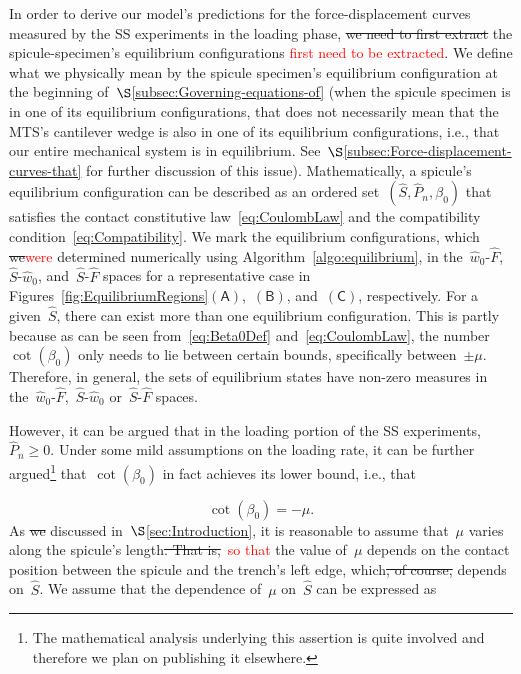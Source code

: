 \documentclass[preprint,10pt,times]{elsarticle}
\numberwithin{equation}{section}
\newcommand{\pr}[1]{\left( #1 \right)}
\newcommand{\subf}[1]{\pr{\textsf{#1}}}
\begin{document}
In order to derive our model's predictions for the force-displacement
curves measured by the SS experiments in the loading phase, \sout{we need
to first extract} the spicule-specimen's equilibrium configurations \textcolor{red}{first need to be extracted}.
We define what we physically mean by the spicule specimen's equilibrium
configuration at the beginning of~$\S$\ref{subsec:Governing-equations-of}
(when the spicule specimen is in one of its equilibrium configurations,
that does not necessarily mean that the MTS's cantilever wedge is
also in one of its equilibrium configurations, i.e., that our entire
mechanical system is in equilibrium. See~$\S$\ref{subsec:Force-displacement-curves-that}
for further discussion of this issue). Mathematically, a spicule's
equilibrium configuration can be described as an ordered set~$\pr{\hat{S},\hat{P}_{n},\beta_0}$
that satisfies the contact constitutive law~\eqref{eq:CoulombLaw}
and the compatibility condition~\eqref{eq:Compatibility}. We mark
the equilibrium configurations, which \sout{we}\textcolor{red}{were} determined numerically using
Algorithm~\ref{algo:equilibrium}, in the~$\hat{w}_0$-$\hat{F}$,~$\hat{S}$-$\hat{w}_0$,
and~$\hat{S}$-$\hat{F}$ spaces for a representative case in Figures{~\ref{fig:EquilibriumRegions}}$\subf{A}$,~$\subf{B}$,
and~$\subf{C}$, respectively. For a given~$\hat{S}$, there can
exist more than one equilibrium configuration. This is partly because
as can be seen from~\eqref{eq:Beta0Def} and~\eqref{eq:CoulombLaw},
the number~$\cot\pr{\beta_0}$ only needs to lie between certain
bounds, specifically between~$\pm\mu$. Therefore, in general, the
sets of equilibrium states have non-zero measures in the~$\hat{w}_0$-$\hat{F}$,~$\hat{S}$-$\hat{w}_0$
or~$\hat{S}$-$\hat{F}$ spaces.

However, it can be argued that in the loading portion of the SS experiments,~$\hat{P}_{n}\ge 0$.
Under some mild assumptions on the loading rate, it can be further
argued\footnote{The mathematical analysis underlying this assertion is quite involved
and therefore we plan on publishing it elsewhere.} that~$\cot\pr{\beta_0}$ in fact achieves its lower bound, i.e.,
that

\begin{equation}
\cot\pr{\beta_0}=-\mu.
\label{eq:MoreRestrictiveCoulombLaw}
\end{equation}As \sout{we} discussed in~$\S$\ref{sec:Introduction}, it is reasonable
to assume that~$\mu$ varies along the spicule's length\sout{. That is,}\textcolor{red}{~so that}
the value of~$\mu$ depends on the contact position between the spicule
and the trench's left edge, which\sout{, of course,} depends on~$\hat{S}$.
We assume that the dependence of~$\mu$ on~$\hat{S}$ can be expressed
as
\end{document}
